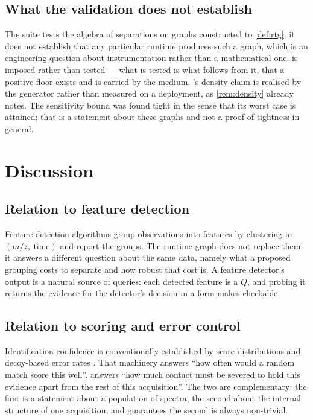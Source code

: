 \documentclass[11pt,a4paper]{article}
\theoremstyle{definition}
\theoremstyle{remark}
\begin{document}
\subsection{What the validation does not establish}

The suite tests the algebra of separations on graphs constructed to
\cref{def:rtg}; it does not establish that any particular runtime
produces such a graph, which is an engineering question about
instrumentation rather than a mathematical one.
 is imposed rather than tested --- what is tested
is what follows from it, that a positive floor exists and is carried by
the medium. 's density claim is realised by the
generator rather than measured on a deployment, as \cref{rem:density}
already notes. The sensitivity bound was found tight in the sense that
its worst case is attained; that is a statement about these graphs and
not a proof of tightness in general.

\section{Discussion}
\label{sec:discussion}

\subsection{Relation to feature detection}

Feature detection algorithms group observations into features by
clustering in $(m/z,\ \text{time})$ and report the groups. The runtime
graph does not replace them; it answers a different question about the
same data, namely what a proposed grouping costs to separate and how
robust that cost is. A feature detector's output is a natural source of
queries: each detected feature is a $Q$, and probing it returns the
evidence for the detector's decision in a form
 makes checkable.

\subsection{Relation to scoring and error control}

Identification confidence is conventionally established by score
distributions and decoy-based error rates
\citep{elias2007target,kall2007semi}. That machinery answers ``how often
would a random match score this well''.  answers
``how much contact must be severed to hold this evidence apart from the
rest of this acquisition''. The two are complementary: the first is a
statement about a population of spectra, the second about the internal
structure of one acquisition, and  guarantees the
second is always non-trivial.
\end{document}
